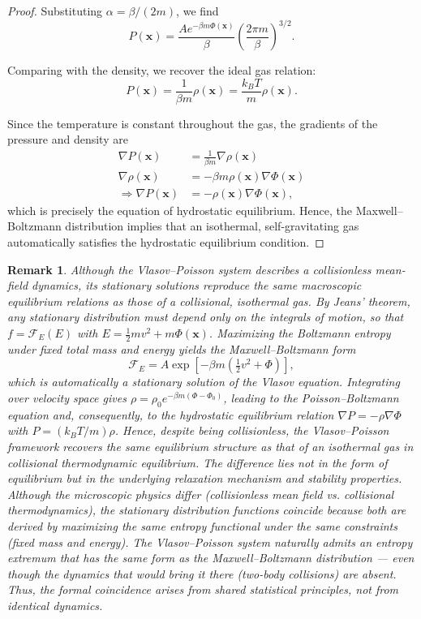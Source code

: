 \documentclass[12pt,a4paper]{article}
\newtheorem{rem}[thm]{Remark}
\numberwithin{equation}{section}
\begin{document}
\begin{proof}
Substituting $\alpha = \beta/(2m)$, we find
\begin{equation}
P(\mathbf{x}) = \frac{A e^{-\beta m \Phi(\mathbf{x})}}{\beta} \left( \frac{2 \pi m}{\beta} \right)^{3/2}.
\end{equation}

Comparing with the density, we recover the ideal gas relation:
\begin{equation}
P(\mathbf{x}) = \frac{1}{\beta m} \rho(\mathbf{x}) = \frac{k_B T}{m} \rho(\mathbf{x}).
\end{equation}

Since the temperature is constant throughout the gas, the gradients of the pressure and density are
\begin{align}
\nabla P(\mathbf{x}) &= \frac{1}{\beta m} \nabla \rho(\mathbf{x}) \\
\nabla \rho(\mathbf{x}) &= - \beta m \rho(\mathbf{x}) \nabla \Phi(\mathbf{x}) \\
\Rightarrow \nabla P(\mathbf{x}) &= - \rho(\mathbf{x}) \nabla \Phi(\mathbf{x}),
\end{align}
which is precisely the equation of hydrostatic equilibrium. Hence, the Maxwell--Boltzmann distribution implies that an isothermal, self-gravitating gas automatically satisfies the hydrostatic equilibrium condition.
\end{proof}

\begin{rem}
Although the Vlasov--Poisson system describes a collisionless mean-field dynamics, its stationary solutions reproduce the same macroscopic equilibrium relations as those
of a collisional, isothermal gas. By Jeans' theorem, any stationary distribution must depend only on the integrals of motion,
so that $f = \mathcal{F}_{E}(E)$ with $E = \tfrac{1}{2} m v^2 + m \Phi(\mathbf{x})$. Maximizing the Boltzmann entropy under fixed total mass and energy yields the
Maxwell--Boltzmann form
\[
\mathcal{F}_{E} = A \exp[-\beta m (\tfrac{1}{2}v^2 + \Phi)],
\]
which is automatically a stationary solution of the Vlasov equation. Integrating over velocity space gives $\rho = \rho_0 e^{-\beta m(\Phi - \Phi_0)}$,
leading to the Poisson--Boltzmann equation and, consequently, to the hydrostatic equilibrium relation $\nabla P = -\rho \nabla \Phi$ with $P = (k_B T/m)\rho$. Hence, despite being collisionless, the Vlasov--Poisson framework recovers the same equilibrium structure as that of an isothermal gas in collisional thermodynamic equilibrium. The difference lies not in the form of equilibrium but in the underlying relaxation mechanism and stability properties. Although the microscopic physics differ (collisionless mean field vs. collisional thermodynamics), the stationary distribution functions coincide because both are derived by maximizing the same entropy functional under the same constraints (fixed mass and energy). The Vlasov–Poisson system naturally admits an entropy extremum that has the same form as the Maxwell–Boltzmann distribution — even though the dynamics that would bring it there (two-body collisions) are absent. Thus, the formal coincidence arises from shared statistical principles, not from identical dynamics.
\end{rem}
\end{document}
